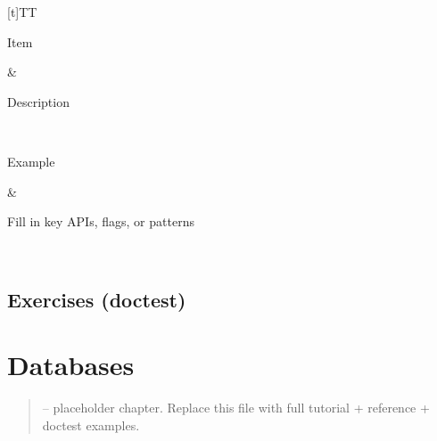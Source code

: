 \documentclass[a4paper,11pt,english]{sphinxmanual}
\begin{document}
\begin{savenotes}\sphinxattablestart
\sphinxthistablewithglobalstyle
\centering
\begin{tabulary}{\linewidth}[t]{TT}
\sphinxtoprule
\begin{varwidth}[t]{}
\sphinxstyletheadfamily \sphinxAtStartPar
Item
\sphinxbeforeendvarwidth
\end{varwidth}%
&\begin{varwidth}[t]{}
\sphinxstyletheadfamily \sphinxAtStartPar
Description
\sphinxbeforeendvarwidth
\end{varwidth}%
\\
\sphinxmidrule
\sphinxtableatstartofbodyhook\begin{varwidth}[t]{}
\sphinxAtStartPar
Example
\sphinxbeforeendvarwidth
\end{varwidth}%
&\begin{varwidth}[t]{}
\sphinxAtStartPar
Fill in key APIs, flags, or patterns
\sphinxbeforeendvarwidth
\end{varwidth}%
\\
\sphinxbottomrule
\end{tabulary}
\sphinxtableafterendhook\par
\sphinxattableend\end{savenotes}


\subsection{Exercises (doctest)}
\label{\detokenize{third_party/data_science:exercises-doctest}}
\begin{sphinxVerbatim}[commandchars=\\\{\}]
\end{sphinxVerbatim}

\sphinxstepscope


\section{Databases}
\label{\detokenize{third_party/databases:databases}}\label{\detokenize{third_party/databases::doc}}\begin{quote}

\sphinxAtStartPar
{} – placeholder chapter. Replace this file with full tutorial + reference + doctest examples.
\end{quote}
\end{document}
